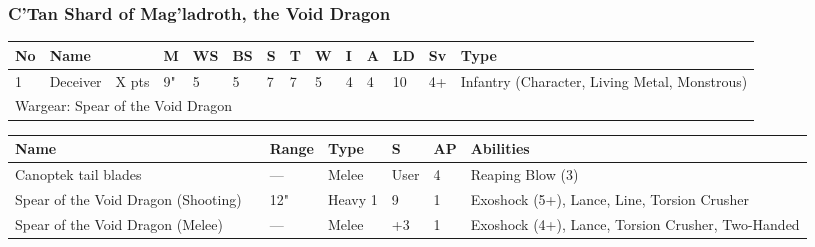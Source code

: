 \newpage
\subsubsection{C'Tan Shard of Mag'ladroth, the Void Dragon}

\noindent
\begin{tabular}{||m{10pt} m{90pt} m{30pt} m{11pt} m{11pt} m{11pt} m{11pt} m{11pt} m{11pt} m{11pt} m{11pt} m{11pt} m{11pt} m{135pt}||}
\hline
No & Name & & M & WS & BS & S & T & W & I & A & LD & Sv & Type \\
\hline
1 & Deceiver & X pts & 9" & 5 & 5 & 7 & 7 & 5 & 4 & 4 & 10 & 4+ & Infantry (Character, Living Metal, Monstrous)\\
\hline
\hline
\multicolumn{14}{||Z{532 pt}||}{Wargear: Spear of the Void Dragon}\\
\hline
\end{tabular}

\noindent
\begin{tabular}{||m{140pt} m{0pt} m{31pt} m{55pt} m{12pt} m{12pt} m{210pt}||}
\hline
Name & & Range & Type & S & AP & Abilities \\
\hline
Canoptek tail blades & & — & Melee & User & 4 & Reaping Blow (3) \\
Spear of the Void Dragon (Shooting) &  & 12" & Heavy 1 & 9 & 1 & Exoshock (5+), Lance, Line, Torsion Crusher \\
Spear of the Void Dragon (Melee) &  & — & Melee & +3 & 1 & Exoshock (4+), Lance, Torsion Crusher, Two-Handed \\
\hline
\end{tabular}

